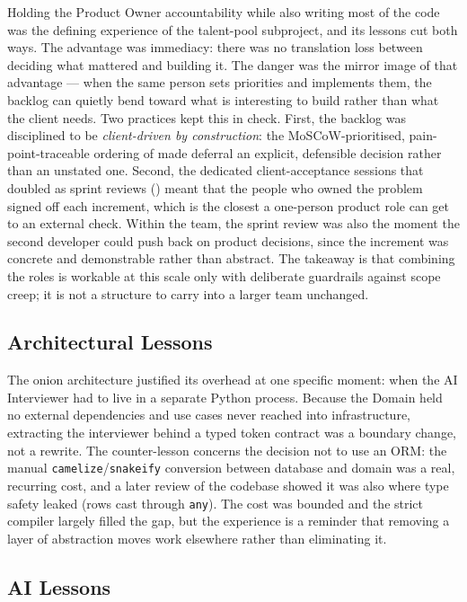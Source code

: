 Holding the Product Owner accountability while also writing most of the code
was the defining experience of the talent-pool subproject, and its lessons
cut both ways.
The advantage was immediacy: there was no translation loss between deciding
what mattered and building it. The danger was the mirror image of that
advantage --- when the same person sets priorities and implements them, the
backlog can quietly bend toward what is interesting to build rather than what
the client needs. Two practices kept this in check. First, the backlog was
disciplined to be \emph{client-driven by construction}: the MoSCoW-prioritised,
pain-point-traceable ordering of  made deferral an
explicit, defensible decision rather than an unstated one. Second, the
dedicated client-acceptance sessions that doubled as sprint reviews
() meant that the people who owned the problem signed
off each increment, which is the closest a one-person product role can get to
an external check. Within the team, the sprint review was also the moment the
second developer could push back on product decisions, since the increment
was concrete and demonstrable rather than abstract. The takeaway is
that combining the roles is workable at this scale only with deliberate
guardrails against scope creep; it is not a structure to carry into a larger
team unchanged.

\subsection{Architectural Lessons}
\label{sec:concl-arch}

The onion architecture justified its overhead at one specific moment: when
the AI Interviewer had to live in a separate Python process. Because the
Domain held no external dependencies and use cases never reached into
infrastructure, extracting the interviewer behind a typed token contract was
a boundary change, not a rewrite. The counter-lesson concerns the decision
not to use an ORM: the manual \texttt{camelize}/\texttt{snakeify} conversion
between database and domain was a real, recurring cost, and a later review of
the codebase showed it was also where type safety leaked (rows cast through
\texttt{any}). The cost was bounded and the strict compiler largely filled
the gap, but the experience is a reminder that removing a layer of
abstraction moves work elsewhere rather than eliminating it.

\subsection{AI Lessons}
\label{sec:concl-ai}

